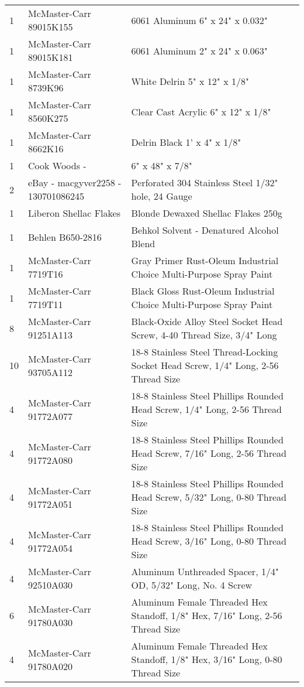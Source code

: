 \begin{longtabu}{X[1,c,m] X[6,c,m] X[9,l,m]}
  1 & McMaster-Carr 89015K155 & 6061 Aluminum 6" x 24" x 0.032" \\
  1 & McMaster-Carr 89015K181 & 6061 Aluminum 2" x 24" x 0.063" \\
  1 & McMaster-Carr 8739K96 & White Delrin 5" x 12" x 1/8" \\
  1 & McMaster-Carr 8560K275 & Clear Cast Acrylic 6" x 12" x 1/8" \\
  1 & McMaster-Carr 8662K16 & Delrin Black 1' x 4" x 1/8" \\
  1 & Cook Woods - \wood{} & 6" x 48" x 7/8" \\
  2 & eBay - macgyver2258 - 130701086245 & Perforated 304 Stainless Steel 1/32" hole, 24 Gauge \\ \mrule

  1 & Liberon Shellac Flakes & Blonde Dewaxed Shellac Flakes 250g \\
  1 & Behlen B650-2816 & Behkol Solvent - Denatured Alcohol Blend \\
  1 & McMaster-Carr 7719T16 & Gray Primer Rust-Oleum Industrial Choice Multi-Purpose Spray Paint \\
  1 & McMaster-Carr 7719T11 & Black Gloss Rust-Oleum Industrial Choice Multi-Purpose Spray Paint \\ \mrule

  8 & McMaster-Carr 91251A113 & Black-Oxide Alloy Steel Socket Head Screw, 4-40 Thread Size, 3/4" Long \\
  10 & McMaster-Carr 93705A112 & 18-8 Stainless Steel Thread-Locking Socket Head Screw, 1/4" Long, 2-56 Thread Size \\
  4 & McMaster-Carr 91772A077 & 18-8 Stainless Steel Phillips Rounded Head Screw, 1/4" Long, 2-56 Thread Size \\
  4 & McMaster-Carr 91772A080 & 18-8 Stainless Steel Phillips Rounded Head Screw, 7/16" Long, 2-56 Thread Size \\
  4 & McMaster-Carr 91772A051 & 18-8 Stainless Steel Phillips Rounded Head Screw, 5/32" Long, 0-80 Thread Size \\
  4 & McMaster-Carr 91772A054 & 18-8 Stainless Steel Phillips Rounded Head Screw, 3/16" Long, 0-80 Thread Size \\

  4 & McMaster-Carr 92510A030 & Aluminum Unthreaded Spacer, 1/4" OD, 5/32" Long, No. 4 Screw \\
  6 & McMaster-Carr 91780A030 & Aluminum Female Threaded Hex Standoff, 1/8" Hex, 7/16" Long, 2-56 Thread Size \\
  4 & McMaster-Carr 91780A020 & Aluminum Female Threaded Hex Standoff, 1/8" Hex, 3/16" Long, 0-80 Thread Size \\


\end{longtabu}
